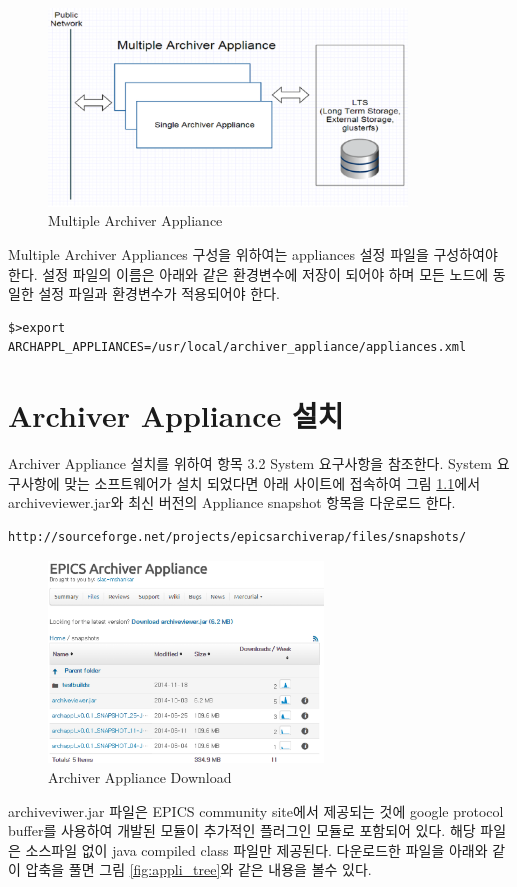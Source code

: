 \documentclass[11pt
  , a4paper
  , article
  , oneside
]{memoir}
\begin{document}
\begin{figure}[h!]
	\centering
	\includegraphics[width=0.85\textwidth, height=0.3\textheight]{./images/image-4.eps}
	\caption{Multiple Archiver Appliance}
	\label{fig:multi_appliance} 
\end{figure}

Multiple Archiver Appliances 구성을 위하여는 appliances 설정 파일을 구성하여야 한다. 설정 파일의 이름은 아래와 같은 환경변수에 저장이 되어야 하며 모든 노드에 동일한 설정 파일과 환경변수가 적용되어야 한다.
\begin{lstlisting}[style=termstyle]
$>export ARCHAPPL_APPLIANCES=/usr/local/archiver_appliance/appliances.xml
\end{lstlisting}


\chapter{Archiver Appliance 설치}
Archiver Appliance 설치를 위하여 항목 3.2 System 요구사항을 참조한다. System 요구사항에 맞는 소프트웨어가 설치 되었다면 아래 사이트에 접속하여 그림 \ref{fig:appli_download}에서 archiveviewer.jar와 최신 버전의 Appliance snapshot 항목을 다운로드 한다.
\begin{lstlisting}[style=termstyle]
http://sourceforge.net/projects/epicsarchiverap/files/snapshots/
\end{lstlisting}
\begin{figure}[h!]
	\centering
	\includegraphics[width=0.65\textwidth, height=0.25\textheight]{./images/appli_download.eps}
	\caption{Archiver Appliance Download}
	\label{fig:appli_download} 
\end{figure}
archiveviwer.jar 파일은 EPICS community site에서 제공되는 것에 google protocol buffer를 사용하여 개발된 모듈이 추가적인 플러그인 모듈로 포함되어 있다.  해당 파일은 소스파일 없이 java compiled class 파일만 제공된다. 다운로드한 파일을 아래와 같이 압축을 풀면 그림 \ref{fig:appli_tree}와 같은 내용을 볼수 있다.
\end{document}
